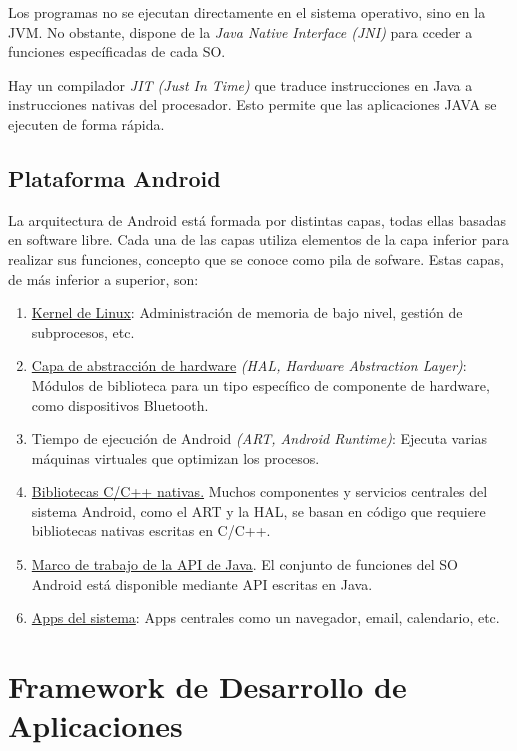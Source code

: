 Los programas no se ejecutan directamente en el sistema operativo, sino en la JVM. No obstante, dispone de la \textit{Java Native Interface (JNI)} para cceder a funciones específicadas de cada SO.


Hay un compilador \textit{JIT (Just In Time)} que traduce instrucciones en Java a instrucciones nativas del procesador. Esto permite que las aplicaciones JAVA se ejecuten de forma rápida.


\subsection{Plataforma Android}

La arquitectura de Android está formada por distintas capas, todas ellas basadas en software libre. Cada una de las capas utiliza elementos de la capa inferior para realizar sus funciones, concepto que se conoce como pila de sofware. Estas capas, de más inferior a superior, son:
\begin{enumerate}
    \item \underline{Kernel de Linux}: Administración de memoria de bajo nivel, gestión de subprocesos, etc.
    
    \item \underline{Capa de abstracción de hardware} \textit{(HAL, Hardware Abstraction Layer)}: Módulos de biblioteca para un tipo específico de componente de hardware, como dispositivos Bluetooth.

    \item Tiempo de ejecución de Android \textit{(ART, Android Runtime)}: Ejecuta varias máquinas virtuales que optimizan los procesos.

    \item \underline{Bibliotecas C/C++ nativas.} Muchos componentes y servicios centrales del sistema Android, como el ART y la HAL, se basan en código que requiere bibliotecas nativas escritas en C/C++.

    \item \underline{Marco de trabajo de la API de Java}. El conjunto de funciones del SO Android está disponible mediante API escritas en Java.

    \item \underline{Apps del sistema}: Apps centrales como un navegador, email, calendario, etc.
\end{enumerate}


\section{Framework de Desarrollo de Aplicaciones}
